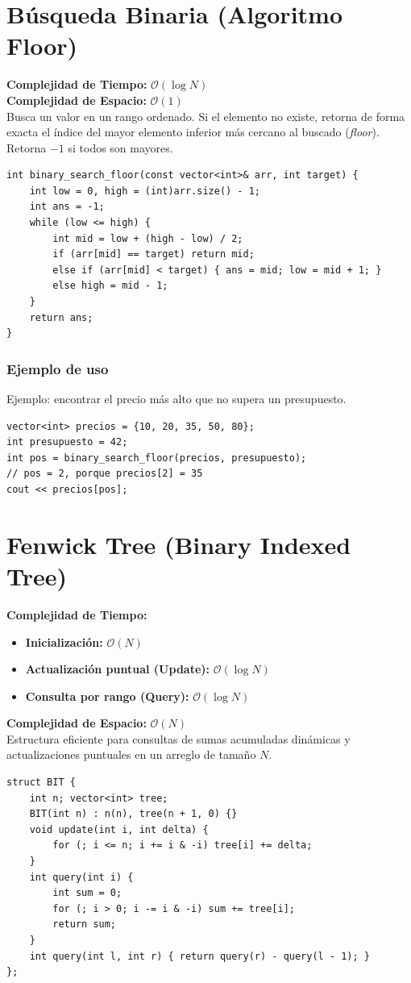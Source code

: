 \documentclass[10pt,twocolumn,letterpaper]{report}
\begin{document}
\section{Búsqueda Binaria (Algoritmo Floor)}
\textbf{Complejidad de Tiempo:} $\mathcal{O}(\log N)$ \\
\textbf{Complejidad de Espacio:} $\mathcal{O}(1)$ \\
Busca un valor en un rango ordenado. Si el elemento no existe, retorna de forma exacta el índice del mayor elemento inferior más cercano al buscado (\textit{floor}). Retorna $-1$ si todos son mayores.
\begin{lstlisting}
int binary_search_floor(const vector<int>& arr, int target) {
    int low = 0, high = (int)arr.size() - 1;
    int ans = -1;
    while (low <= high) {
        int mid = low + (high - low) / 2;
        if (arr[mid] == target) return mid; 
        else if (arr[mid] < target) { ans = mid; low = mid + 1; }
        else high = mid - 1; 
    }
    return ans;
}
\end{lstlisting}
\subsubsection*{Ejemplo de uso}
Ejemplo: encontrar el precio más alto que no supera un presupuesto.
\begin{lstlisting}
vector<int> precios = {10, 20, 35, 50, 80};
int presupuesto = 42;
int pos = binary_search_floor(precios, presupuesto);
// pos = 2, porque precios[2] = 35
cout << precios[pos];
\end{lstlisting}

\section{Fenwick Tree (Binary Indexed Tree)}
\textbf{Complejidad de Tiempo:}
\begin{itemize}
    \item \textbf{Inicialización:} $\mathcal{O}(N)$
    \item \textbf{Actualización puntual (Update):} $\mathcal{O}(\log N)$
    \item \textbf{Consulta por rango (Query):} $\mathcal{O}(\log N)$
\end{itemize}
\textbf{Complejidad de Espacio:} $\mathcal{O}(N)$ \\
Estructura eficiente para consultas de sumas acumuladas dinámicas y actualizaciones puntuales en un arreglo de tamaño $N$.
\begin{lstlisting}
struct BIT {
    int n; vector<int> tree;
    BIT(int n) : n(n), tree(n + 1, 0) {}
    void update(int i, int delta) {
        for (; i <= n; i += i & -i) tree[i] += delta;
    }
    int query(int i) {
        int sum = 0;
        for (; i > 0; i -= i & -i) sum += tree[i];
        return sum;
    }
    int query(int l, int r) { return query(r) - query(l - 1); }
};
\end{lstlisting}
\end{document}
